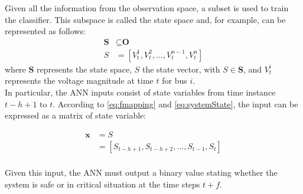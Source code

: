 Given all the information from the observation space, a subset is used to train the classifier. This subspace is called the state space and, for example, can be represented as follows: 
\begin{equation} \label{eq:systemState}
  \begin{aligned}
    \textbf{S} & \subseteq \textbf{O} \\
    S & = [V^{1}_t,V^{2}_t,\dots,V^{n-1}_t,V^{n}_t] 
  \end{aligned}
\end{equation}
\noindent where $\textbf{S}$ represents the state space, $S$ the state vector, with $S \in \textbf{S}$, and $V^{i}_t$ represents the voltage magnitude at time $t$ for bus $i$. \\

In particular, the \gls{ANN} inputs consist of state variables from time instance $t-h+1$ to $t$. According to \ref{eq:fmapping} and \ref{eq:systemState}, the input can be expressed as a matrix of state variable:

\begin{equation}
  \begin{aligned}
    \textbf{x} & = S \\
    & = [S_{t-h+1},S_{t-h+2},\dots,S_{t-1},S_{t}]\\
  \end{aligned}
\end{equation}

\noindent Given this input, the \gls{ANN} must output a binary value stating whether the system is safe or in critical situation at the time steps $t+f$. 

